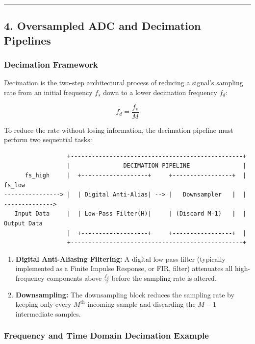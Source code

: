 \documentclass[
]{article}
\providecommand{\tightlist}{%
  \setlength{\itemsep}{0pt}\setlength{\parskip}{0pt}}
\begin{document}
\begin{center}\rule{0.5\linewidth}{0.5pt}\end{center}

\subsection{4. Oversampled ADC and Decimation
Pipelines}\label{oversampled-adc-and-decimation-pipelines}

\subsubsection{Decimation Framework}\label{decimation-framework}

Decimation is the two-step architectural process of reducing a signal's
sampling rate from an initial frequency \(f_s\) down to a lower
decimation frequency \(f_d\):

\[f_d = \frac{f_s}{M}\]

To reduce the rate without losing information, the decimation pipeline
must perform two sequential tasks:

\begin{verbatim}
                  +-------------------------------------------------+
                  |               DECIMATION PIPELINE               |
      fs_high     |  +-------------------+     +-----------------+  |      fs_low
----------------> |  | Digital Anti-Alias| --> |   Downsampler   |  | -------------->
   Input Data     |  | Low-Pass Filter(H)|     | (Discard M-1)   |  |   Output Data
                  |  +-------------------+     +-----------------+  |
                  +-------------------------------------------------+
\end{verbatim}

\begin{enumerate}
\def\labelenumi{\arabic{enumi}.}
\tightlist
\item
  \textbf{Digital Anti-Aliasing Filtering:} A digital low-pass filter
  (typically implemented as a Finite Impulse Response, or FIR, filter)
  attenuates all high-frequency components above \(\frac{f_d}{2}\)
  before the sampling rate is altered.
\item
  \textbf{Downsampling:} The downsampling block reduces the sampling
  rate by keeping only every \(M^{\text{th}}\) incoming sample and
  discarding the \(M-1\) intermediate samples.
\end{enumerate}

\subsubsection{Frequency and Time Domain Decimation
Example}\label{frequency-and-time-domain-decimation-example}
\end{document}
